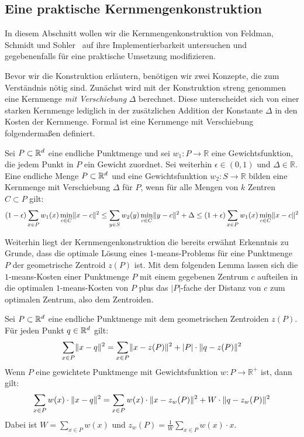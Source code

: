 \subsection{Eine praktische Kernmengenkonstruktion}

In diesem Abschnitt wollen wir die Kernmengenkonstruktion von Feldman, Schmidt und Sohler~\cite{FeldmanSS13,Schmidt14} auf ihre
Implementierbarkeit untersuchen und gegebenenfalls für eine praktische Umsetzung modifizieren.

Bevor wir die Konstruktion erläutern, benötigen wir zwei Konzepte, die zum Verständnis nötig sind. Zunächst wird mit der
Konstruktion streng genommen eine Kernmenge \emph{mit Verschiebung} $\Delta$ berechnet. Diese unterscheidet sich von einer
starken Kernmenge lediglich in der zusätzlichen Addition der Konstante $\Delta$ in den Kosten der Kernmenge.
Formal ist eine Kernmenge mit Verschiebung folgendermaßen definiert.

\begin{definition}
\label{def:coreset-with-offset}
	Sei $P \subset \mathbb{R}^{d}$ eine endliche Punktmenge und sei $w_1 : P \rightarrow \mathbb{R}$ eine Gewichtsfunktion, die jedem
	Punkt in $P$ ein Gewicht zuordnet. Sei weiterhin $\epsilon \in (0,1)$ und $\Delta \in \mathbb{R}$.
	Eine endliche Menge $P \subset \mathbb{R}^{d}$ und eine
	Gewichtsfunktion $w_2 : S \rightarrow \mathbb{R}$ bilden eine Kernmenge mit Verschiebung $\Delta$ für $P$, wenn
	für alle Mengen von $k$ Zentren $C \subset P$ gilt:
	\[ (1-\epsilon) \sum_{x \in P} w_1(x) \min_{c \in C} \lVert {x} - {c} \rVert^2 
		\leq \sum_{y \in S} w_2(y) \min_{c \in C} \lVert {y} - {c} \rVert^2 + \Delta
		\leq  (1+\epsilon) \sum_{x \in P} w_1(x) \min_{c \in C} \lVert {x} - {c} \rVert^2 \]
\end{definition}

Weiterhin liegt der Kernmengenkonstruktion die bereits erwähnt Erkenntnis zu Grunde, dass die optimale Lösung eines
$1$-means-Problems für eine Punktmenge $P$ der geometrische Zentroid $z(P)$ ist. Mit dem folgenden Lemma lassen sich die
$1$-means-Kosten einer Punktmenge $P$ mit einem gegebenen Zentrum $c$ aufteilen in die optimalen $1$-means-Kosten von $P$
plus das $\left|P\right|$-fache der Distanz von $c$ zum optimalen Zentrum, also dem Zentroiden.

\begin{lemma}
\label{lemma:1-means-cost-parts}
	Sei $P \subset \mathbb{R}^{d}$ eine endliche Punktmenge mit dem geometrischen Zentroiden $z(P)$. Für jeden Punkt $q \in \mathbb{R}^{d}$ gilt:
	\[ \sum_{x \in P} \lVert {x} - {q} \rVert^2 = \sum_{x \in P} \lVert {x} - {z(P)} \rVert^2 + \left|P\right| \cdot \lVert {q} - {z(P)} \rVert^2
	 \]
	 Wenn $P$ eine gewichtete Punktmenge mit Gewichtsfunktion $w : P \rightarrow \mathbb{R}^+$ ist, dann gilt:
	 \[ \sum_{x \in P} w(x) \cdot \lVert {x} - {q} \rVert^2 = \sum_{x \in P} w(x) \cdot \lVert {x} - {z_w(P)} \rVert^2 +
	 	W \cdot \lVert {q} - {z_w(P)} \rVert^2 \]
	 Dabei ist $W = \sum_{x \in P} w(x)$ und $z_w(P) = \frac{1}{W} \sum_{x \in P} w(x) \cdot x$.
\end{lemma}

